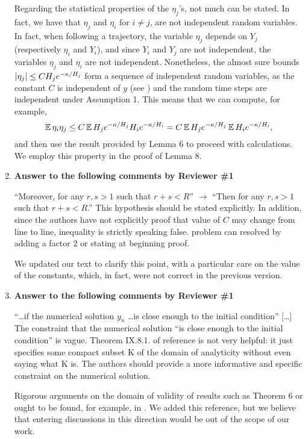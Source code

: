 \documentclass[10pt]{article}
\begin{document}
\begin{enumerate}
	Regarding the statistical properties of the $\eta_j$'s, not much can be stated. In fact, we have that $\eta_j$ and $\eta_i$ for $i\neq j$, are not independent random variables. In fact, when following a trajectory, the variable $\eta_j$ depends on $Y_j$ (respectively $\eta_i$ and $Y_i$), and since $Y_i$ and $Y_j$ are not independent, the variables $\eta_j$ and $\eta_i$ are not independent. Nonetheless, the almost sure bounds $\lvert\eta_j\rvert \leq CH_je^{-\kappa/H_j}$ form a sequence of independent random variables, as the constant $C$ is independent of $y$ (see \cite[Theorem IX.7.6]{HLW06}) and the random time steps are independent under Assumption 1. This means that we can compute, for example,
	\begin{equation}
		\operatorname{\mathbb{E}} \eta_i \eta_j \leq C \operatorname{\mathbb{E}} H_j e^{-\kappa/H_j} H_i e^{-\kappa/H_i} = C \operatorname{\mathbb{E}} H_j e^{-\kappa/H_j} \operatorname{\mathbb{E}} H_i e^{-\kappa/H_i},
	\end{equation}
	and then use the result provided by Lemma 6 to proceed with calculations. We employ this property in the proof of Lemma 8. 
	\item \textbf{Answer to the following comments by Reviewer \#1}
	\begin{itquote}
		``Moreover, for any $r,s>1$ such that $r+s<R$'' $\to$ ``Then for any $r,s>1$ such that $r+s<R$.'' This hypothesis should be stated explicitly. In addition, since the authors have not explicitly proof that value of $C$ may change from line to line, inequality is strictly speaking false. problem can resolved by adding a factor 2 or stating at beginning proof.
	\end{itquote}
	We updated our text to clarify this point, with a particular care on the value of the constants, which, in fact, were not correct in the previous version. 
	\item \textbf{Answer to the following comments by Reviewer \#1}
	\begin{itquote}
		``\ldots if the numerical solution $y_n$ \ldots is close enough to the initial condition'' [\ldots] The constraint that the numerical solution ``is close enough to the initial condition'' is vague. Theorem IX.8.1. of reference \cite{HLW06} is not very helpful: it just specifies some compact subset K of the domain of analyticity without even saying what K is. The authors should provide a more informative and specific constraint on the numerical solution.
	\end{itquote}
	Rigorous arguments on the domain of validity of results such as Theorem 6 or \cite[Theorem IX.8.1]{HLW06} ought to be found, for example, in \cite{BeG94}. We added this reference, but we believe that entering discussions in this direction would be out of the scope of our work.

\end{enumerate}
\end{document}

